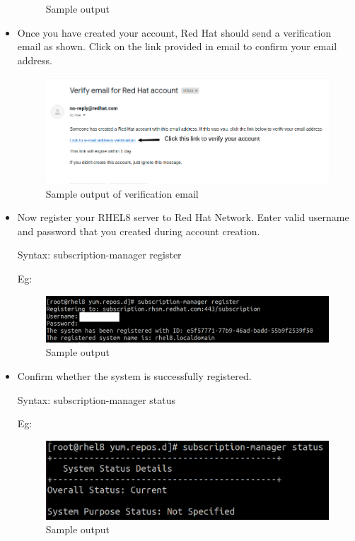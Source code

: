 \begin{flushleft}
\begin{itemize}
\begin{figure}[h!]
				\caption{Sample output}
				\label{fig:iso3}
			\end{figure}
		\newpage
			\item Once you have created your account, Red Hat should send a verification email as shown. Click on the link provided in email to confirm your email address.
			\begin{figure}[h!]
				\centering
				\includegraphics[scale=.25]{content/chapter11/images/verify.png}
				\caption{Sample output of verification email}
				\label{fig:iso4}
			\end{figure}
			\item Now register your RHEL8 server to Red Hat Network. Enter valid username and password that you created during account creation.
				\begin{tcolorbox}[breakable,notitle,boxrule=-0pt,colback=pink,colframe=pink]
				\color{black}
				\font=9pt
				Syntax: subscription-manager register
				\font=4pt
			\end{tcolorbox}
			Eg:
			\begin{figure}[h!]
				\centering
				\includegraphics[scale=.2]{content/chapter11/images/2.png}
				\caption{Sample output}
				\label{fig:iso5}
			\end{figure}
			
			\bigskip
			\bigskip
			\item Confirm whether the system is successfully registered.
			\begin{tcolorbox}[breakable,notitle,boxrule=-0pt,colback=pink,colframe=pink]
				\color{black}
				\font=9pt
				Syntax: subscription-manager status
				\font=4pt
			\end{tcolorbox}
			Eg:
			\begin{figure}[h!]
				\centering
				\includegraphics[scale=.3]{content/chapter11/images/3.png}
				\caption{Sample output}
				\label{fig:iso6}
			\end{figure}
			

\end{itemize}
\end{flushleft}
